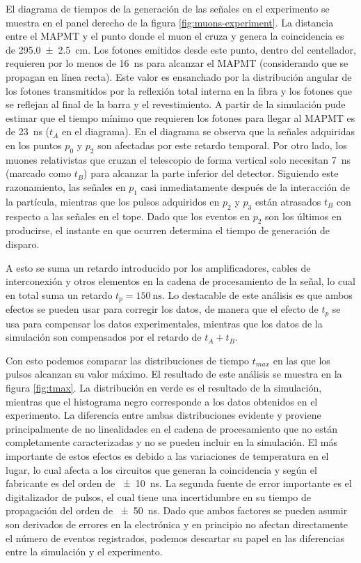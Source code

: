 El diagrama de tiempos de la generación de las señales en el experimento se muestra en el panel derecho de la figura \ref{fig:muons-experiment}. La distancia entre el MAPMT y el punto donde el muon el cruza y genera la coincidencia es de \SI{295.0(25)}{\cm}. Los fotones emitidos desde este punto, dentro del centellador, requieren por lo menos de \SI{16}{\ns} para alcanzar el MAPMT (considerando que se propagan en línea recta). Este valor es ensanchado por la distribución angular de los fotones transmitidos por la reflexión total interna en la fibra y los fotones que se reflejan al final de la barra y el revestimiento. A partir de la simulación pude estimar que el tiempo mínimo que requieren los fotones para llegar al MAPMT es de \SI{23}{\ns} ($t_{A}$ en el diagrama). En el diagrama se observa que la señales adquiridas en los puntos $p_{0}$ y $p_{2}$ son afectadas por este retardo temporal. Por otro lado, los muones relativistas que cruzan el telescopio de forma vertical solo necesitan \SI{7}{\ns} (marcado como $t_{B}$) para alcanzar la parte inferior del detector. Siguiendo este razonamiento, las señales en $p_{1}$ casi inmediatamente después de la interacción de la partícula, mientras que los pulsos adquiridos en $p_{2}$ y $p_{3}$ están atrasados $t_{B}$ con respecto a las señales en el tope. Dado que los eventos en $p_{2}$ son los últimos en producirse, el instante en que ocurren determina el tiempo de generación de disparo.

A esto se suma un retardo introducido por los amplificadores, cables de interconexión y otros elementos en la cadena de procesamiento de la señal, lo cual en total suma un retardo $t_{p}=\SI{150}{\ns}$. Lo destacable de este análisis es que ambos efectos se pueden usar para corregir los datos, de manera que el efecto de $t_{p}$ se usa para compensar los datos experimentales, mientras que los datos de la simulación son compensados por el retardo de $t_{A}+t_{B}$.

Con esto podemos comparar las distribuciones de tiempo $t_{max}$ en las que los pulsos alcanzan su valor máximo. El resultado de este análisis se muestra en la figura \ref{fig:tmax}. La distribución en verde es el resultado de la simulación, mientras que el histograma negro corresponde a los datos obtenidos en el experimento. La diferencia entre ambas distribuciones evidente y proviene principalmente de no linealidades en el cadena de procesamiento que no están completamente caracterizadas y no se pueden incluir en la simulación. El más importante de estos efectos es debido a las variaciones de temperatura en el lugar, lo cual afecta a los circuitos que generan la coincidencia y según el fabricante es del orden de \SI{\pm 10}{\ns}. La segunda fuente de error importante es el digitalizador de pulsos, el cual tiene una incertidumbre en su tiempo de propagación del orden de \SI{\pm 50}{\ns}. Dado que ambos factores se pueden asumir son derivados de errores en la electrónica y en principio no afectan directamente el número de eventos registrados, podemos descartar su papel en las diferencias entre la simulación y el experimento.

